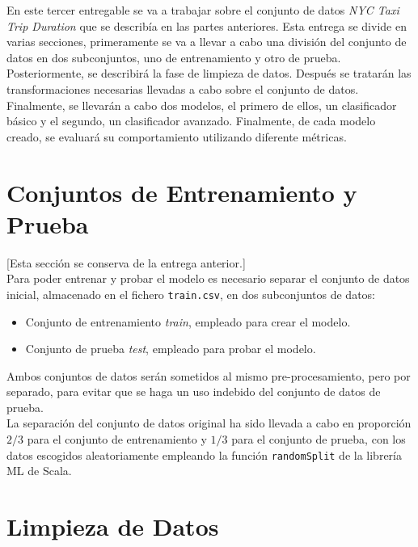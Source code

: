\documentclass[12pt]{article}
\begin{document}
En este tercer entregable se va a trabajar sobre el conjunto de datos \textit{NYC Taxi Trip Duration} \cite{kaggle} que se describía en las partes anteriores. Esta entrega se divide en varias secciones, primeramente se va a llevar a cabo una división del conjunto de datos en dos subconjuntos, uno de entrenamiento y otro de prueba. Posteriormente, se describirá la fase de limpieza de datos. Después se tratarán las transformaciones necesarias llevadas a cabo sobre el conjunto de datos. Finalmente, se llevarán a cabo dos modelos, el primero de ellos, un clasificador básico y el segundo, un clasificador avanzado. Finalmente, de cada modelo creado, se evaluará su comportamiento utilizando diferente métricas.\\

\section{Conjuntos de Entrenamiento y Prueba}\label{cap2}

[Esta sección se conserva de la entrega anterior.]\\

Para poder entrenar y probar el modelo es necesario separar el conjunto de datos inicial, almacenado en el fichero \texttt{train.csv}, en dos subconjuntos de datos:

\begin{itemize}
    \item Conjunto de entrenamiento \textit{train}, empleado para crear el modelo.
    \item Conjunto de prueba \textit{test}, empleado para probar el modelo.
\end{itemize}

Ambos conjuntos de datos serán sometidos al mismo pre-procesamiento, pero por separado, para evitar que se haga un uso indebido del conjunto de datos de prueba.\\

La separación del conjunto de datos original ha sido llevada a cabo en proporción $2/3$ para el conjunto de entrenamiento y $1/3$ para el conjunto de prueba, con los datos escogidos aleatoriamente empleando la función \texttt{randomSplit} de la librería ML de Scala.\\

\newpage

\section{Limpieza de Datos}\label{cap3}
\end{document}
